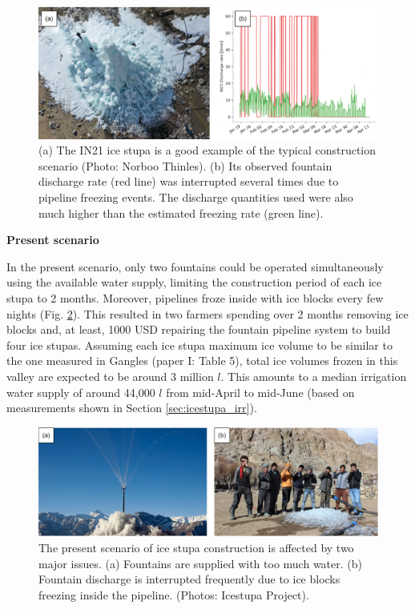 \begin{figure}[htb]
	\includegraphics[width=\textwidth]{figs/gangles_data}

  \caption{(a) The IN21 ice stupa is a good example of the typical construction scenario (Photo: Norboo
  Thinles). (b) Its observed fountain discharge rate (red line) was interrupted several times due to pipeline
freezing events. The discharge quantities used were also much higher than the estimated freezing rate (green
line). }

	\label{fig:gangles_data}
\end{figure}

\textbf{Present scenario}

In the present scenario, only two fountains could be operated simultaneously using the available water
supply, limiting the construction period of each ice stupa to 2 months. Moreover, pipelines froze
inside with ice blocks every few nights (Fig. \ref{fig:issues}). This resulted in two farmers spending over 2 months removing ice blocks and, at least, 1000 USD repairing the fountain pipeline system to build
four ice stupas. Assuming each ice stupa maximum ice volume to be similar to the one measured in Gangles (paper I:
Table 5), total ice volumes frozen in this valley are expected to be around 3 million $l$. This amounts to
a median irrigation water supply of around 44,000 $l$ from mid-April to mid-June (based on measurements
shown in Section \ref{sec:icestupa_irr}).

\begin{figure}[htb]
	\includegraphics[width=\textwidth]{figs/construction_issues}

  \caption{The present scenario of ice stupa construction is affected by two major issues. (a) Fountains are
  supplied with too much water. (b) Fountain discharge is interrupted frequently due to ice blocks freezing
  inside the pipeline. (Photos: Icestupa Project).}

	\label{fig:issues}
\end{figure}

